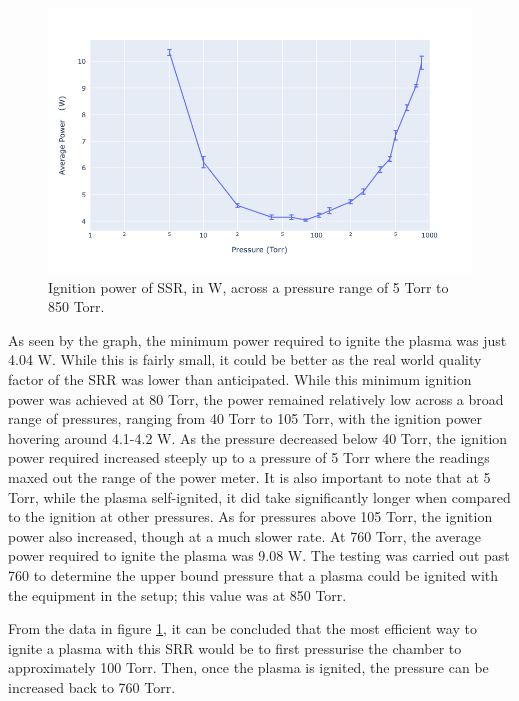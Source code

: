 \begin{figure}[h!]
	\centering
	\includegraphics[width=\linewidth]{chapter_4/figures/ignition_power.png}
	\caption{Ignition power of SSR, in W, across a pressure range of 5 Torr to 850 Torr.}
	\label{fig:ignition_power}
\end{figure}

As seen by the graph, the minimum power required to ignite the plasma was just 4.04 W. While this is fairly small, it could be better as the real world quality factor of the SRR was lower than anticipated. While this minimum ignition power was achieved at 80 Torr, the power remained relatively low across a broad range of pressures, ranging from 40 Torr to 105 Torr, with the ignition power hovering around 4.1-4.2 W. As the pressure decreased below 40 Torr, the ignition power required increased steeply up to a pressure of 5 Torr where the readings maxed out the range of the power meter. It is also important to note that at 5 Torr, while the plasma self-ignited, it did take significantly longer when compared to the ignition at other pressures. As for pressures above 105 Torr, the ignition power also increased, though at a much slower rate. At 760 Torr, the average power required to ignite the plasma was 9.08 W. The testing was carried out past 760 to determine the upper bound pressure that a plasma could be ignited with the equipment in the setup; this value was at 850 Torr. 

From the data in figure \ref{fig:ignition_power}, it can be concluded that the most efficient way to ignite a plasma with this SRR would be to first pressurise the chamber to approximately 100 Torr. Then, once the plasma is ignited, the pressure can be increased back to 760 Torr. 

\pagebreak

